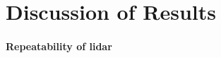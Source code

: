 \chapter{Discussion of Results}
\label{chap:results}






\subsubsection{Repeatability of \acrshort{lidar}}
\label{sec:markerdetectionaccuracy}